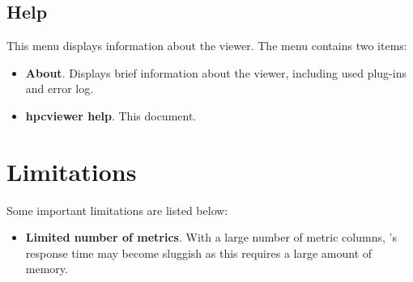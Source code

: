 
\subsection{Help}

This menu displays information about the viewer. The menu contains two items:
\begin{itemize}

\item \textbf{About}.
  Displays brief information about the viewer, including used plug-ins and error log.

\item \textbf{hpcviewer help}.
  This document.

\end{itemize}



\section{Limitations}

Some important \hpcviewer{} limitations are listed below:
\begin{itemize}

\item \textbf{Limited number of metrics}.
  With a large number of metric columns, \hpcviewer{}'s response time may become sluggish as this requires a large amount of memory.


\end{itemize}
